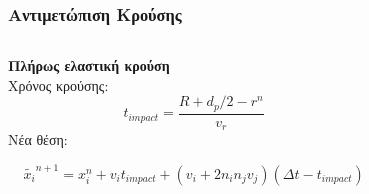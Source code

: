 \documentclass[12pt, hyperref={pdfpagelabels=false},aspectratio=169,fleqn, greek]{beamer}
\begin{document}
\begin{frame}
  \frametitle{Αντιμετώπιση Κρούσης}
	\begin{columns}[c]
		\begin{column}{0.5\textwidth}
			\textbf{Πλήρως ελαστική κρούση}\\
			\bigskip
			Χρόνος κρούσης:
			$$ t_{impact} = \frac{R + d_p/2 - r^n}{v_r} $$ 
			Νέα θέση:
			
			$$\tilde{x_i}^{n+1} = x_i^n + v_i t_{impact} + (v_i + 2n_i n_jv_j ) (\Delta t - t_{impact})$$
		\end{column}

		\begin{column}{0.5\textwidth}
			\vspace{-2.00cm}
			\begin{figure}[h]
				\resizebox{\textwidth}{!}{
					\Large }
			\end{figure}

			\end{column}
	\end{columns}
\end{frame}
\end{document}
